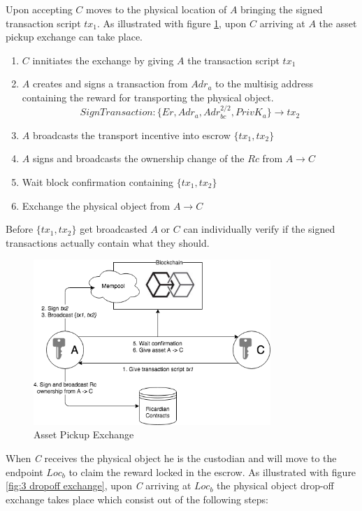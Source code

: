Upon accepting $C$ moves to the physical location of $A$ bringing the signed transaction script $tx_1$. As illustrated with figure \ref{fig:2 first exchange}, upon $C$ arriving at $A$ the asset pickup exchange can take place.

\begin{enumerate}
  \item $C$ innitiates the exchange by giving $A$ the transaction script $tx_1$
  \item $A$ creates and signs a transaction from $Adr_a$ to the multisig address containing the reward for transporting the physical object.
  \[SignTransaction \colon \{Er, Adr_a, Adr_{bc}^{2/2}, PrivK_a\} \rightarrow tx_2\]
  \item $A$ broadcasts the transport incentive into escrow $\{tx_1, tx_2\}$
  \item $A$ signs and broadcasts the ownership change of the $Rc$ from $A\rightarrow C$
  \item Wait block confirmation containing $\{tx_1, tx_2\}$
  \item Exchange the physical object from $A\rightarrow C$
\end{enumerate}

Before $\{tx_1, tx_2\}$ get broadcasted $A$ or $C$ can individually verify if the signed transactions actually contain what they should.

\begin{figure}[h]
\centering
\includegraphics[width=0.8\textwidth]{images/exchange_01.png}
\caption{Asset Pickup Exchange}
\label{fig:2 first exchange}
\end{figure}

 When \textit{C} receives the physical object he is the custodian and will move to the endpoint $Loc_b$ to claim the reward locked in the escrow. As illustrated with figure \ref{fig:3 dropoff exchange}, upon \textit{C} arriving at $Loc_b$ the physical object drop-off exchange takes place which consist out of the following steps:

